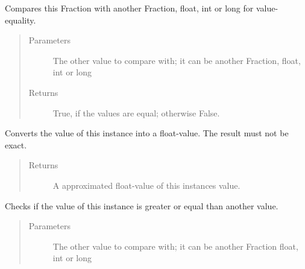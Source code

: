 \documentclass[letterpaper,10pt,english]{sphinxhowto}
\begin{document}
\begin{fulllineitems}
\begin{fulllineitems}
\label{\detokenize{fraction:fraction.Fraction.__eq__}}
Compares this Fraction with another Fraction, float, int or long for value-equality.
\begin{quote}\begin{description}
\item[{Parameters}] \leavevmode
{} \textendash{} The other value to compare with; it can be another Fraction, float, int or long

\item[{Returns}] \leavevmode
True, if the values are equal; otherwise False.

\end{description}\end{quote}

\end{fulllineitems}


\begin{fulllineitems}
\label{\detokenize{fraction:fraction.Fraction.__float__}}
Converts the value of this instance into a float-value. The result must not be exact.
\begin{quote}\begin{description}
\item[{Returns}] \leavevmode
A approximated float-value of this instances value.

\end{description}\end{quote}

\end{fulllineitems}


\begin{fulllineitems}
\label{\detokenize{fraction:fraction.Fraction.__ge__}}
Checks if the value of this instance is greater or equal than another value.
\begin{quote}\begin{description}
\item[{Parameters}] \leavevmode
{} \textendash{} The other value to compare with; it can be another Fraction float, int or long


\end{description}
\end{quote}
\end{fulllineitems}
\end{fulllineitems}
\end{document}
